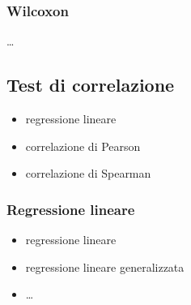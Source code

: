\documentclass[letterpaper,10pt,italian]{jupyterBook}
\begin{document}
\subsubsection{Wilcoxon}
\label{\detokenize{ch/statistics/hp-test-single:wilcoxon}}
\sphinxAtStartPar
…

\sphinxstepscope


\subsection{Test di correlazione}
\label{\detokenize{ch/statistics/hp-test-correlation:test-di-correlazione}}\label{\detokenize{ch/statistics/hp-test-correlation::doc}}
\sphinxAtStartPar
{}
\begin{itemize}
\item {} 
\sphinxAtStartPar
regressione lineare

\item {} 
\sphinxAtStartPar
correlazione di Pearson

\item {} 
\sphinxAtStartPar
correlazione di Spearman

\end{itemize}


\subsubsection{Regressione lineare}
\label{\detokenize{ch/statistics/hp-test-correlation:regressione-lineare}}\begin{itemize}
\item {} 
\sphinxAtStartPar
regressione lineare

\item {} 
\sphinxAtStartPar
regressione lineare generalizzata

\item {} 
\sphinxAtStartPar
…

\end{itemize}
\end{document}
